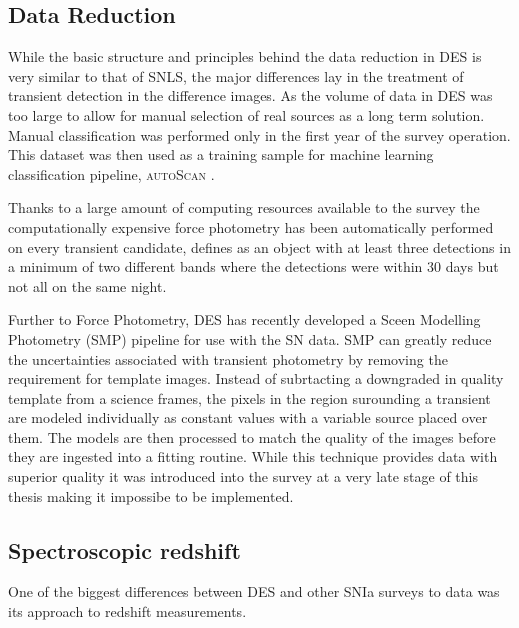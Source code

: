\subsection{Data Reduction}
While the basic structure and principles behind the data reduction in DES is very similar to that of SNLS, the major differences lay in the treatment of transient detection in the difference images. As the volume of data in DES was too large to allow for manual selection of real sources as a long term solution. Manual classification was performed only in the first year of the survey operation. This dataset was then used as a training sample for machine learning classification pipeline, \textsc{autoScan} \cite{Goldstein2015}.

Thanks to a large amount of computing resources available to the survey the computationally expensive force photometry has been automatically performed on every transient candidate, defines as an object with at least three detections in a minimum of two different bands where the detections were within 30 days but not all on the same night.

Further to Force Photometry, DES has recently developed a Sceen Modelling Photometry (SMP) pipeline for use with the SN data. SMP can greatly reduce the uncertainties associated with transient photometry by removing the requirement for template images. Instead of subrtacting a downgraded in quality template from a science frames, the pixels in the region surounding a transient are modeled individually as constant values with a variable source placed over them. The models are then processed to match the quality of the images before they are ingested into a fitting routine. While this technique provides data with superior quality it was introduced into the survey at a very late stage of this thesis making it impossibe to be implemented.

\subsection{Spectroscopic redshift}
One of the biggest differences between DES and other SNIa surveys to data was its approach to redshift measurements.

